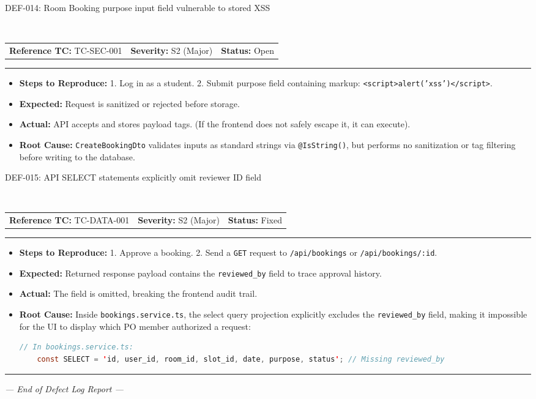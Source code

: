 \documentclass[11pt,a4paper]{article}
\makeatletter
\newcommand{\defectheader}[5]{%
    \needspace{6\baselineskip}
    \noindent\colorbox{primaryblue}{\parbox{\dimexpr\textwidth-2\fboxsep\relax}{
        \color{white}\bfseries\large\strut #1: #2
    }}
    \nopagebreak\\
    \noindent\begin{tabularx}{\textwidth}{@{}X X X@{}}
        \textbf{Reference TC:} #3 & \textbf{Severity:} #4 & \textbf{Status:} #5 \\
    \end{tabularx}
    \nopagebreak\vspace{0.1cm}
    \nopagebreak\hrule\vspace{0.2cm}
}
\makeatother
\begin{document}
\defectheader{DEF-014}{Room Booking purpose input field vulnerable to stored XSS}{TC-SEC-001}{S2 (Major)}{Open}
\begin{itemize}[noitemsep,topsep=1pt,leftmargin=0.5cm]
    \item \textbf{Steps to Reproduce:} 
    1. Log in as a student. 2. Submit purpose field containing markup: \texttt{<script>alert('xss')</script>}.
    \item \textbf{Expected:} Request is sanitized or rejected before storage.
    \item \textbf{Actual:} API accepts and stores payload tags. (If the frontend does not safely escape it, it can execute).
    \item \textbf{Root Cause:} \texttt{CreateBookingDto} validates inputs as standard strings via \texttt{@IsString()}, but performs no sanitization or tag filtering before writing to the database.
\end{itemize}

\newpage

\defectheader{DEF-015}{API SELECT statements explicitly omit reviewer ID field}{TC-DATA-001}{S2 (Major)}{Fixed}
\begin{itemize}[noitemsep,topsep=1pt,leftmargin=0.5cm]
    \item \textbf{Steps to Reproduce:} 
    1. Approve a booking. 2. Send a \texttt{GET} request to \texttt{/api/bookings} or \texttt{/api/bookings/:id}.
    \item \textbf{Expected:} Returned response payload contains the \texttt{reviewed\_by} field to trace approval history.
    \item \textbf{Actual:} The field is omitted, breaking the frontend audit trail.
    \item \textbf{Root Cause:} Inside \texttt{bookings.service.ts}, the select query projection explicitly excludes the \texttt{reviewed\_by} field, making it impossible for the UI to display which PO member authorized a request:
    \begin{lstlisting}[language=Java]
    // In bookings.service.ts:
    const SELECT = 'id, user_id, room_id, slot_id, date, purpose, status'; // Missing reviewed_by
    \end{lstlisting}
\end{itemize}

\vspace{0.4cm}\hrule\vspace{0.4cm}
\begin{center}
\textit{--- End of Defect Log Report ---}
\end{center}
\end{document}
